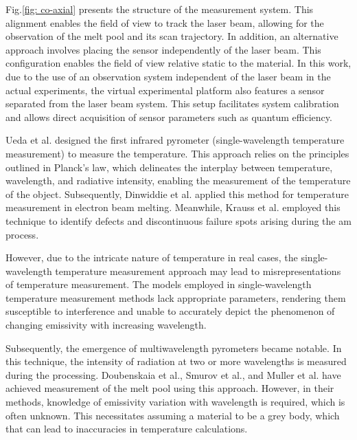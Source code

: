 Fig.\ref{fig: co-axial} presents the structure of the measurement system. 
This alignment enables the field of view to track the laser beam, 
allowing for the observation of the melt pool and its scan trajectory.
In addition, an alternative approach involves placing the sensor 
independently of the laser beam. This configuration enables the 
field of view relative static to the material\cite{Craeghs.2012,Dinwiddie.2014,Price.2012,Price.2013,Rodriguez.2012,Wegner.2011}.
In this work, due to the use of an observation system independent of the 
laser beam in the actual experiments, the virtual experimental 
platform also features a sensor separated from the laser beam system. 
This setup facilitates system calibration and allows direct acquisition of 
sensor parameters such as quantum efficiency.


Ueda et al. designed the first infrared pyrometer (single-wavelength temperature 
measurement) to measure the temperature. This approach relies on the principles outlined in 
Planck's law, which delineates the interplay between temperature, 
wavelength, and radiative intensity, enabling the measurement of the 
temperature of the object\cite{Ueda.1986}. Subsequently, Dinwiddie et al. 
applied this method for temperature measurement in electron beam melting\cite{Dinwiddie.2014}. 
Meanwhile, Krauss et al. employed this technique to identify defects 
and discontinuous failure spots arising during the \gls{am} process\cite{Krauss.2012}.


However, due to the intricate nature of temperature in real cases, the 
single-wavelength temperature measurement approach may lead to 
misrepresentations of temperature measurement. The models employed in 
single-wavelength temperature measurement methods lack appropriate 
parameters, rendering them susceptible to interference and unable to 
accurately depict the phenomenon of changing emissivity with 
increasing wavelength\cite{Raplee.2017}.


Subsequently, the emergence of multiwavelength pyrometers became notable. 
In this technique, the intensity of radiation at two or more wavelengths 
is measured during the processing. 
Doubenskaia et al.\cite{Doubenskaia.2013}, Smurov et al.\cite{Smurov.2013b}, and Muller et al.\cite{Muller.2012} 
have achieved measurement of the melt pool using this approach. 
However, in their methods, knowledge of emissivity variation with 
wavelength is required, which is often unknown. This necessitates 
assuming a material to be a grey body, which that can lead to 
inaccuracies in temperature calculations.

